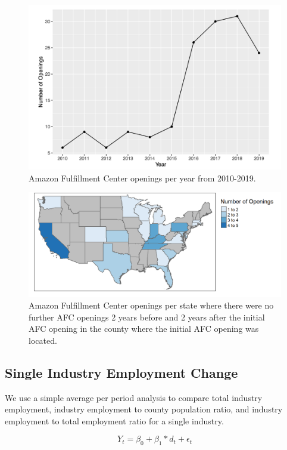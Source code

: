 \documentclass[11pt]{article}
\begin{document}
\begin{figure}[H]
\centering
\includegraphics[width=13cm]{OPENPERYEAR.png}
\caption{Amazon Fulfillment Center openings per year from 2010-2019.}
\end{figure}

\begin{figure}[H]
\centering
\includegraphics[width=17.5cm]{Map2Data.png}
\caption{Amazon Fulfillment Center openings per state where there were no further AFC openings 2 years before and 2 years after the initial AFC opening in the county where the initial AFC opening was located.}
\end{figure}

\subsection{Single Industry Employment Change}

\-\hspace{0.5cm} We use a simple average per period analysis to compare total industry employment, industry employment to county population ratio, and industry employment to total employment ratio for a single industry.

$$Y_{t} = \beta_0+ \beta_1*d_{t} + \epsilon_{t}$$
\end{document}
